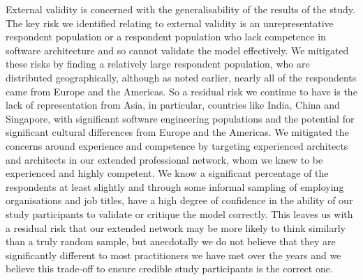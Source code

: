 External validity is concerned with the generalisability of the results of the study.  The key risk we identified relating to external validity is an unrepresentative respondent population or a respondent population who lack competence in software architecture and so cannot validate the model effectively.  We mitigated these risks by finding a relatively large respondent population, who are distributed geographically, although as noted earlier, nearly all of the respondents came from Europe and the Americas.  So a residual risk we continue to have is the lack of representation from Asia, in particular, countries like India, China and Singapore, with significant software engineering populations and the potential for significant cultural differences from Europe and the Americas.  We mitigated the concerns around experience and competence by targeting experienced architects and architects in our extended professional network, whom we knew to be experienced and highly competent.  We know a significant percentage of the respondents at least slightly and through some informal sampling of employing organisations and job titles, have a high degree of confidence in the ability of our study participants to validate or critique the model correctly.  This leaves us with a residual risk that our extended network may be more likely to think similarly than a truly random sample, but anecdotally we do not believe that they are significantly different to most practitioners we have met over the years and we believe this trade-off to ensure credible study participants is the correct one.

